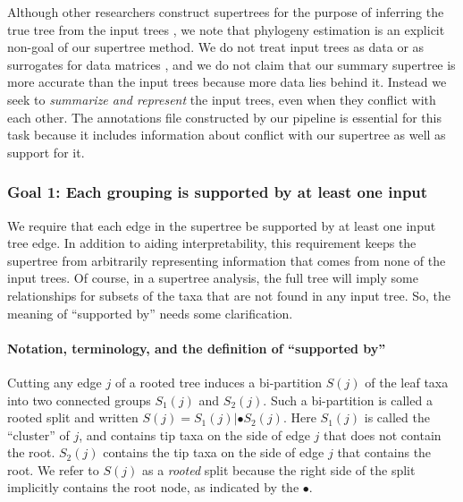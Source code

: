 \documentclass[fleqn,12pt,lineno,english]{wlpeerj}
\begin{document}
Although other researchers construct supertrees for the purpose of
inferring the true tree from the input trees \citep{BinindaEmonds2007b,Davis2014},
we note that phylogeny estimation is an explicit non-goal of our
supertree method.  We do not treat input trees as data or as surrogates for
data matrices \citep{gatesy2004critique}, and we do not claim that our
summary supertree is more accurate than the input trees because more
data lies behind it. Instead we seek to \emph{summarize and represent}
the input trees, even when they conflict with each other.  The
annotations file constructed by our pipeline is essential for this
task because it includes information about conflict with our supertree
as well as support for it.

\subsubsection{Goal 1: Each grouping is supported by at least one input}

We require that each edge in the supertree be supported by at least
one input tree edge. In addition to aiding interpretability, this
requirement keeps the supertree from arbitrarily representing information
that comes from none of the input trees. Of course, in a supertree
analysis, the full tree will imply some relationships for subsets
of the taxa that are not found in any input tree. So, the meaning
of ``supported by'' needs some clarification. 

\paragraph*{Notation, terminology, and the definition of ``supported by''}

Cutting any edge \textbf{$j$ }of a rooted tree induces a bi-partition
$S(j)$ of the leaf taxa into two connected groups $S_{1}(j)$ and
$S_{2}(j)$. Such a bi-partition is called a rooted split and written
$S(j)=S_{1}(j)|\bullet S_{2}(j)$. Here $S_{1}(j)$ is called the ``cluster'' of $j$, and contains tip taxa on the side of edge $j$ that does not contain the
root. $S_{2}(j)$ contains the tip taxa on the side of edge $j$ that
contains the root. We refer to $S(j)$ as a \emph{rooted} split because
the right side of the split implicitly contains the root node, as indicated
by the $\bullet$.
\end{document}

